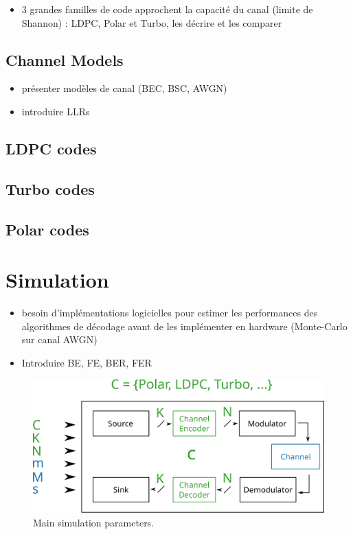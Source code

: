 \begin{itemize}
  \item 3 grandes familles de code approchent la capacité du canal (limite de
    Shannon) : LDPC, Polar et Turbo, les décrire et les comparer
\end{itemize}

\subsection{Channel Models}

\begin{itemize}
  \item présenter modèles de canal (BEC, BSC, AWGN)
  \item introduire LLRs
\end{itemize}

\subsection{LDPC codes}

\subsection{Turbo codes}

\subsection{Polar codes}

\section{Simulation}

\begin{itemize}
  \item besoin d'implémentations logicielles pour estimer les performances des
    algorithmes de décodage avant de les implémenter en hardware (Monte-Carlo
    sur canal AWGN)
  \item Introduire BE, FE, BER, FER
\end{itemize}

\begin{figure}[htp]
  \centering
  \includegraphics[width=0.70\linewidth]{simu/com_chain}
  \caption{Main simulation parameters.}
  \label{fig:simu_com_chain}
\end{figure}

